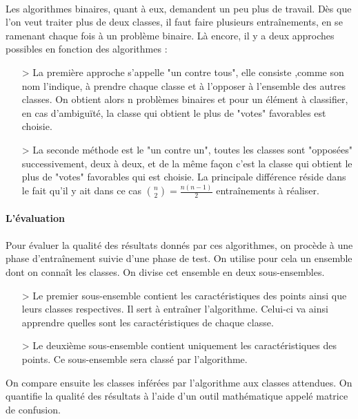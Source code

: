 \paragraph{}
Les algorithmes binaires, quant à eux, demandent un peu plus de travail. Dès que l'on veut traiter plus de deux classes, il faut faire plusieurs entraînements, en se ramenant chaque fois à un problème binaire. Là encore, il y a deux approches possibles en fonction des algorithmes :
 \begin{itemize}
   \item[>] La première approche s'appelle "un contre tous", elle consiste ,comme son nom l'indique, à prendre chaque classe et à l'opposer à l'ensemble des autres classes. On obtient alors n problèmes binaires et pour un élément à classifier, en cas d'ambiguïté, la classe qui obtient le plus de "votes" favorables est choisie.
   \item[>] La seconde méthode est le "un contre un", toutes les classes sont "opposées" successivement, deux à deux, et de la même façon c'est la classe qui obtient le plus de "votes" favorables qui est choisie. La principale différence réside dans le fait qu'il y ait dans ce cas ${n \choose 2}=\frac{n(n-1)}{2}$ entraînements à réaliser.
 \end{itemize}

\paragraph{L'évaluation}
\paragraph{}
Pour évaluer la qualité des résultats donnés par ces algorithmes, on procède à une phase d'entraînement suivie d'une phase de test. 
On utilise pour cela un ensemble dont on connaît les classes. On divise cet ensemble en deux sous-ensembles. 
\begin{itemize}
  \item[>]Le premier sous-ensemble contient les caractéristiques des points ainsi que leurs classes respectives. Il sert à entraîner l'algorithme. Celui-ci va ainsi apprendre quelles sont les caractéristiques de chaque classe. 
  \item[>]Le deuxième sous-ensemble contient uniquement les caractéristiques des points. Ce sous-ensemble sera classé par l'algorithme.
\end{itemize} 

On compare ensuite les classes inférées par l'algorithme aux classes attendues. On quantifie la qualité des résultats à l'aide d'un outil mathématique appelé matrice de confusion. 

